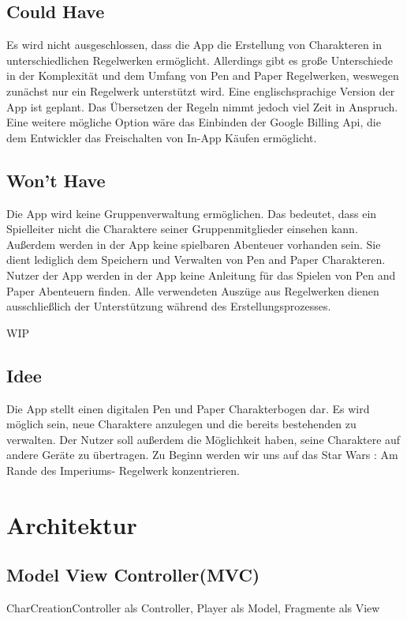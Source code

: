 \subsection{Could Have}
Es wird nicht ausgeschlossen, dass die App die Erstellung von Charakteren in unterschiedlichen Regelwerken ermöglicht. Allerdings gibt es große Unterschiede in der Komplexität und dem Umfang von Pen and Paper Regelwerken, weswegen zunächst nur ein Regelwerk unterstützt wird. Eine englischsprachige Version der App ist geplant. Das Übersetzen der Regeln nimmt jedoch viel Zeit in Anspruch. Eine weitere mögliche Option wäre das Einbinden der Google Billing Api, die dem Entwickler das Freischalten von In-App Käufen ermöglicht.

\subsection{Won't Have}
Die App wird keine Gruppenverwaltung ermöglichen. Das bedeutet, dass ein Spielleiter nicht die Charaktere seiner Gruppenmitglieder einsehen kann. Außerdem werden in der App keine spielbaren Abenteuer vorhanden sein. Sie dient lediglich dem Speichern und Verwalten von Pen and Paper Charakteren. Nutzer der App werden in der App keine Anleitung für das Spielen von Pen and Paper Abenteuern finden. Alle verwendeten Auszüge aus Regelwerken dienen ausschließlich der Unterstützung während des Erstellungsprozesses. 

\newpage
WIP
\subsection{Idee}

Die App stellt einen digitalen Pen und Paper Charakterbogen dar. Es wird möglich sein, neue Charaktere anzulegen und die bereits bestehenden zu verwalten. Der Nutzer soll außerdem die Möglichkeit haben, seine Charaktere auf andere Geräte zu übertragen. Zu Beginn werden wir uns auf das \glqq Star Wars : Am Rande des Imperiums\grqq- Regelwerk konzentrieren.

\section{Architektur}
\subsection{Model View Controller(MVC)}
CharCreationController als Controller, Player als Model, Fragmente als View

